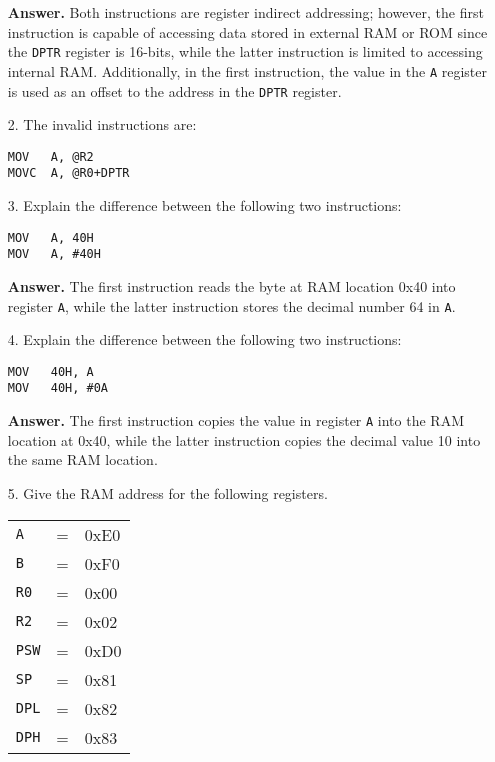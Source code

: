 \documentclass[9pt]{article}
\begin{document}
\begin{enumerate}
\textbf{Answer.} Both instructions are register indirect addressing; however,
the first instruction is capable of accessing data stored in external RAM or
ROM since the \verb|DPTR| register is 16-bits, while the latter instruction is
limited to accessing internal RAM. Additionally, in the first instruction, the
value in the \verb|A| register is used as an offset to the address in the
\verb|DPTR| register.
   \item[2.] The invalid instructions are:
   \begin{verbatim}
MOV   A, @R2
MOVC  A, @R0+DPTR
         \end{verbatim}
   \item[3.] Explain the difference between the following two instructions:
   \begin{verbatim}
MOV   A, 40H
MOV   A, #40H
         \end{verbatim}
         
\textbf{Answer.} The first instruction reads the byte at RAM location 0x40
into register \verb|A|, while the latter instruction stores the decimal number
64 in \verb|A|.
   \item[4.] Explain the difference between the following two instructions:
   \begin{verbatim}
MOV   40H, A
MOV   40H, #0A
         \end{verbatim}
         
\textbf{Answer.} The first instruction copies the value in register \verb|A|
into the RAM location at 0x40, while the latter instruction copies the decimal
value 10 into the same RAM location.
   \item[5.] Give the RAM address for the following registers.
   
             \begin{tabular}{@{}l c l@{}}
                \verb|A| & = & 0xE0 \\
                \verb|B| & = & 0xF0 \\
                \verb|R0| & = & 0x00 \\
                \verb|R2| & = & 0x02 \\
                \verb|PSW| & = & 0xD0 \\
                \verb|SP| & = &  0x81 \\
                \verb|DPL| & = & 0x82 \\
                \verb|DPH| & = & 0x83 \\
             \end{tabular}
\end{enumerate}
\end{document}
